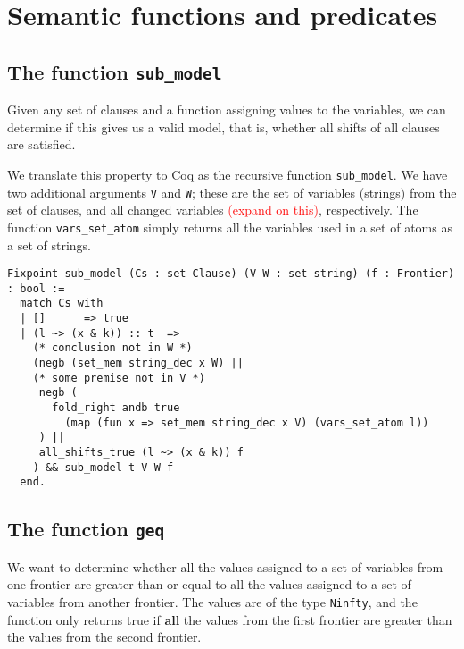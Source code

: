 \section{Semantic functions and predicates}

\subsection{The function \lstinline{sub_model}}

Given any set of clauses and a function assigning values to the variables,
we can determine if this gives us a valid model, that is,
whether all shifts of all clauses are satisfied.

We translate this property to Coq as the recursive function \lstinline{sub_model}.
We have two additional arguments \lstinline{V} and \lstinline{W}; these are
the set of variables (strings) from the set of clauses, and all changed variables \textcolor{red}{(expand on this)}, respectively.
The function \lstinline{vars_set_atom} simply returns all the variables used
in a set of atoms as a set of strings.

\begin{minipage}{\linewidth}
\begin{lstlisting}[language=Coq, label={lst:sub_model_def}, caption={The function \lstinline{sub_model} in Coq}]
Fixpoint sub_model (Cs : set Clause) (V W : set string) (f : Frontier) : bool :=
  match Cs with
  | []      => true
  | (l ~> (x & k)) :: t  =>
    (* conclusion not in W *)
    (negb (set_mem string_dec x W) ||
    (* some premise not in V *)
     negb (
       fold_right andb true
         (map (fun x => set_mem string_dec x V) (vars_set_atom l))
     ) ||
     all_shifts_true (l ~> (x & k)) f
    ) && sub_model t V W f
  end.
\end{lstlisting}
\end{minipage}

\subsection{The function \lstinline{geq}}

We want to determine whether all the values assigned to a set of variables
from one frontier are greater than or equal to all the values assigned to a set of variables
from another frontier. The values are of the type \lstinline{Ninfty}, and the function
only returns true if \textbf{all} the values from the first frontier are greater than
the values from the second frontier.


